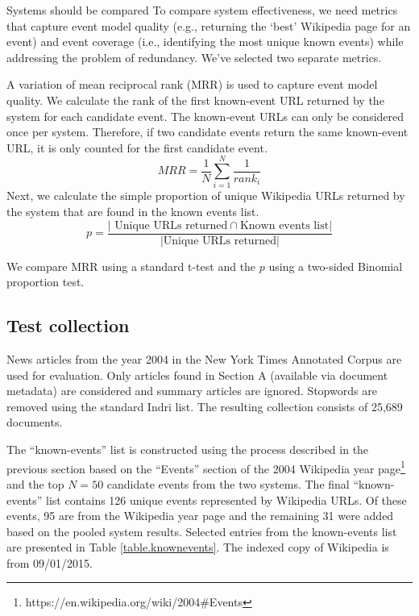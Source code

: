 \documentclass{sig-alternate}
\begin{document}
Systems should be compared 
To compare system effectiveness, we need metrics that capture event model quality (e.g., returning the `best' Wikipedia page for an event) and event coverage (i.e., identifying the most unique known events) while addressing the problem of redundancy. We've selected two separate metrics.  

A variation of mean reciprocal rank (MRR) is used to capture event model quality. We calculate the rank of the first known-event URL returned by the system for each candidate event. The known-event URLs can only be considered once per system. Therefore, if two candidate events return the same known-event URL, it is only counted for the first candidate event.
\[
MRR = \dfrac{1}{N} \sum_{i=1}^{N} \dfrac{1}{rank_i}
\]
Next, we calculate the simple proportion of unique Wikipedia URLs returned by the system that are found in the known events list.
\[
p = \dfrac{\vert \text{ Unique URLs returned} \cap \text{Known events list} \vert}{\vert \text{Unique URLs returned} \vert}
\]

We compare MRR using a standard t-test and the $p$ using a two-sided Binomial proportion test.

\subsection{Test collection}
News articles from the year 2004 in the New York Times Annotated Corpus \cite{Sandhaus2008} are used for evaluation. Only articles found in Section A (available via document metadata) are considered and summary articles are ignored. Stopwords are removed using the standard Indri list. The resulting collection consists of 25,689 documents.

The ``known-events'' list is constructed using the process described in the previous section based on the ``Events'' section of the 2004 Wikipedia year page\footnote{https://en.wikipedia.org/wiki/2004\#Events} and the top $N=50$ candidate events from the two systems.  The final ``known-events'' list contains 126 unique events represented by Wikipedia URLs. Of these events, 95 are from the Wikipedia year page and the remaining 31 were added based on the pooled system results.  Selected entries from the known-events list are presented in Table \ref{table.knownevents}.  The indexed copy of Wikipedia is from 09/01/2015.
\end{document}
